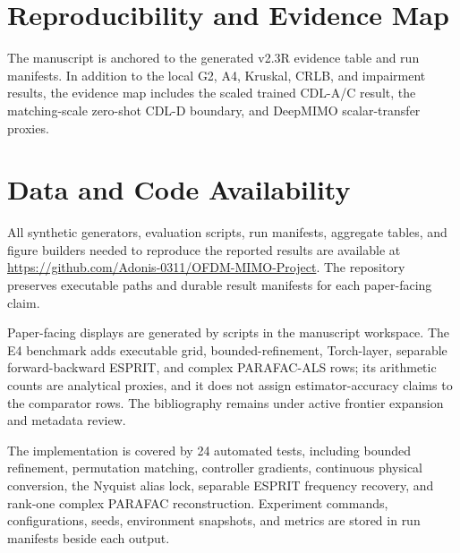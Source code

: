 \section{Reproducibility and Evidence Map}

The manuscript is anchored to the generated v2.3R evidence table and run manifests. In addition to the local G2, A4, Kruskal, CRLB, and impairment results, the evidence map includes the scaled trained CDL-A/C result, the matching-scale zero-shot CDL-D boundary, and DeepMIMO scalar-transfer proxies.

\section{Data and Code Availability}

All synthetic generators, evaluation scripts, run manifests, aggregate tables, and figure builders needed to reproduce the reported results are available at \url{https://github.com/Adonis-0311/OFDM-MIMO-Project}. The repository preserves executable paths and durable result manifests for each paper-facing claim.

Paper-facing displays are generated by scripts in the manuscript workspace. The E4 benchmark adds executable grid, bounded-refinement, Torch-layer, separable forward-backward ESPRIT, and complex PARAFAC-ALS rows; its arithmetic counts are analytical proxies, and it does not assign estimator-accuracy claims to the comparator rows. The bibliography remains under active frontier expansion and metadata review.

The implementation is covered by 24 automated tests, including bounded refinement, permutation matching, controller gradients, continuous physical conversion, the Nyquist alias lock, separable ESPRIT frequency recovery, and rank-one complex PARAFAC reconstruction. Experiment commands, configurations, seeds, environment snapshots, and metrics are stored in run manifests beside each output.
